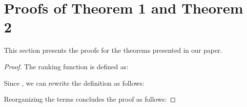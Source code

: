 \documentclass{article}
\newenvironment{customthm}[1]
  {\renewcommand\theinnercustomthm{#1}\innercustomthm}
  {\endinnercustomthm}
\begin{document}
 \section{Proofs of Theorem 1 and Theorem 2}
\label{sec:Proofs}
This section presents the proofs for the theorems presented in our paper.

\begin{customthm}{1}
.
\end{customthm}
\begin{proof}
The ranking function is defined as:

Since , we can rewrite the definition as follows:

Reorganizing the terms concludes the proof as follows:

\end{proof}
\end{document}
